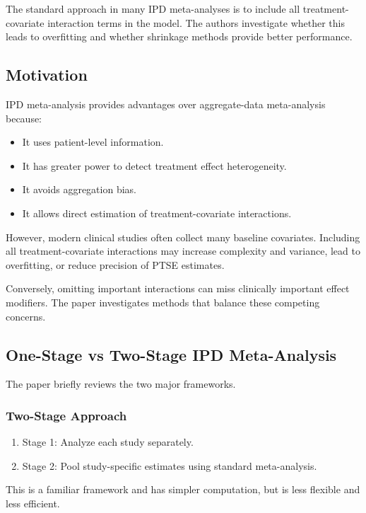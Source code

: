 \documentclass[11pt]{article}
\begin{document}
The standard approach in many IPD meta-analyses is to include all treatment-covariate interaction terms in the model. The authors investigate whether this leads to overfitting and whether shrinkage methods provide better performance.

\subsection*{Motivation}

IPD meta-analysis provides advantages over aggregate-data meta-analysis because:

\begin{itemize}
    \item It uses patient-level information.
    \item It has greater power to detect treatment effect heterogeneity.
    \item It avoids aggregation bias.
    \item It allows direct estimation of treatment-covariate interactions.
\end{itemize}

However, modern clinical studies often collect many baseline covariates. Including all treatment-covariate interactions may increase complexity and variance, lead to overfitting, or reduce precision of PTSE estimates.

Conversely, omitting important interactions can miss clinically important effect modifiers. The paper investigates methods that balance these competing concerns.

\subsection*{One-Stage vs Two-Stage IPD Meta-Analysis}

The paper briefly reviews the two major frameworks.

\subsubsection*{Two-Stage Approach}

\begin{enumerate}
    \item Stage 1: Analyze each study separately.
    \item Stage 2: Pool study-specific estimates using standard meta-analysis.
\end{enumerate}
This is a familiar framework and has simpler computation, but is less flexible and less efficient.
\end{document}
